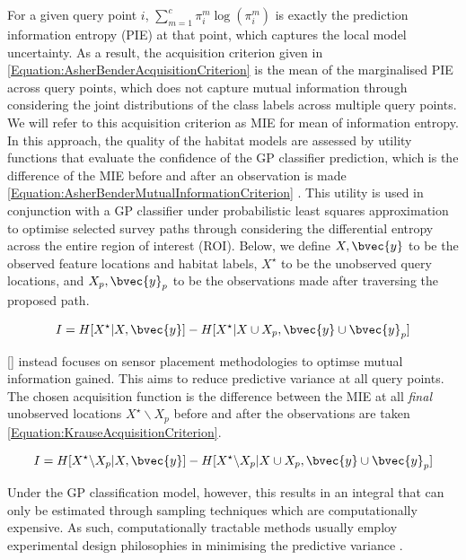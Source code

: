 \documentclass{article}
\newcommand{\incite}[1]{\citeauthor{#1} [\citeyear{#1}]}
\begin{document}
	For a given query point $i$, $\sum_{m = 1}^{c} \pi^{m}_{i} \log(\pi^{m}_{i})$ is exactly the prediction information entropy (PIE) at that point, which captures the local model uncertainty. As a result, the acquisition criterion given in \eqref{Equation:AsherBenderAcquisitionCriterion} is the mean of the marginalised PIE across query points, which does not capture mutual information through considering the joint distributions of the class labels across multiple query points. We will refer to this acquisition criterion as MIE for mean of information entropy. In this approach, the quality of the habitat models are assessed by utility functions that evaluate the confidence of the GP classifier prediction, which is the difference of the MIE before and after an observation is made \eqref{Equation:AsherBenderMutualInformationCriterion} \cite{Rigby:ROB20372}. This utility is used in conjunction with a GP classifier under probabilistic least squares approximation to optimise selected survey paths through considering the differential entropy across the entire region of interest (ROI). Below, we define $X, \bvec{y}$ to be the observed feature locations and habitat labels, $X^{\star}$ to be the unobserved query locations, and $X_{p}, \bvec{y}_{p}$ to be the observations made after traversing the proposed path.

	\begin{equation}
		I = H[X^{\star} | X, \bvec{y}] - H[X^{\star} | X \cup X_{p}, \bvec{y} \cup \bvec{y}_{p}]
	\label{Equation:AsherBenderMutualInformationCriterion}
	\end{equation}
	
	\incite{Krause:2008:NSP:1390681.1390689} instead focuses on sensor placement methodologies to optimse mutual information gained. This aims to reduce predictive variance at all query points. The chosen acquisition function is the difference between the MIE at all \textit{final} unobserved locations $X^{\star} \backslash X_{p}$ before and after the observations are taken \eqref{Equation:KrauseAcquisitionCriterion}.
	
	\begin{equation}
		I = H[X^{\star} \backslash X_{p} | X, \bvec{y}] - H[X^{\star} \backslash X_{p} | X \cup X_{p}, \bvec{y} \cup \bvec{y}_{p}]
	\label{Equation:KrauseAcquisitionCriterion}
	\end{equation}
	
	Under the GP classification model, however, this results in an integral that can only be estimated through sampling techniques which are computationally expensive. As such, computationally tractable methods usually employ experimental design philosophies in minimising the predictive variance \cite{AsherBender}.
	
\end{document}
